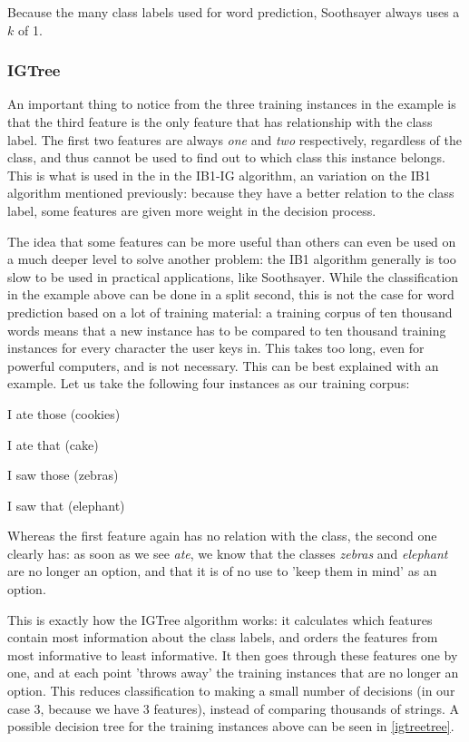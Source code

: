 \documentclass[11pt]{article}
\begin{document}
Because the many class labels used for word prediction, Soothsayer always uses a $k$ of 1.

\subsubsection{IGTree}

An important thing to notice from the three training instances in the example is that the third feature is the only feature that has relationship with the class label. The first two features are always \emph{one} and \emph{two} respectively, regardless of the class, and thus cannot be used to find out to which class this instance belongs. This is what is used in the in the IB1-IG algorithm, an variation on the IB1 algorithm mentioned previously: because they have a better relation to the class label, some features are given more weight in the decision process.

The idea that some features can be more useful than others can even be used on a much deeper level to solve another problem: the IB1 algorithm generally is too slow to be used in practical applications, like Soothsayer. While the classification in the example above can be done in a split second, this is not the case for word prediction based on a lot of training material: a training corpus of ten thousand words means that a new instance has to be compared to ten thousand training instances for every character the user keys in. This takes too long, even for powerful computers, and is not necessary. This can be best explained with an example. Let us take the following four instances as our training corpus:

\begin{examples}
\item I ate those (cookies)
\item I ate that (cake)
\item I saw those (zebras)
\item I saw that (elephant)
\end{examples}

Whereas the first feature again has no relation with the class, the second one clearly has: as soon as we see \emph{ate}, we know that the classes \emph{zebras} and \emph{elephant} are no longer an option, and that it is of no use to 'keep them in mind' as an option.

This is exactly how the IGTree algorithm \cite{daelemans+97} works: it calculates which features contain most information about the class labels, and orders the features from most informative to least informative. It then goes through these features one by one, and at each point 'throws away' the training instances that are no longer an option. This reduces classification to making a small number of decisions (in our case 3, because we have 3 features), instead of comparing thousands of strings. A possible decision tree for the training instances above can be seen in \ref{igtreetree}.
\end{document}
